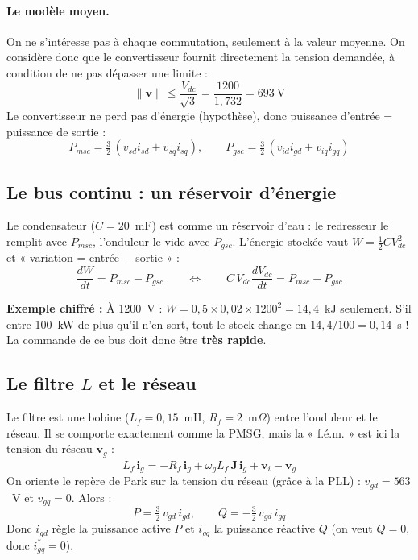 \documentclass[11pt,a4paper]{article}
\newcommand{\bv}[1]{\boldsymbol{#1}}
\newcommand{\Exemple}{\textbf{Exemple chiffré : }}
\begin{document}
\paragraph{Le modèle moyen.}
On ne s'intéresse pas à chaque commutation, seulement à la valeur moyenne. On considère donc que le
convertisseur fournit directement la tension demandée, à condition de ne pas dépasser une limite :
\begin{equation}
\|\bv{v}\| \le \frac{V_{dc}}{\sqrt3} = \frac{1200}{1{,}732} = 693~\text{V}
\end{equation}
Le convertisseur ne perd pas d'énergie (hypothèse), donc puissance d'entrée = puissance de sortie :
\begin{equation}
P_{msc} = \tfrac32\,(v_{sd}i_{sd}+v_{sq}i_{sq}),\qquad P_{gsc} = \tfrac32\,(v_{id}i_{gd}+v_{iq}i_{gq})
\end{equation}

\subsection{Le bus continu : un réservoir d'énergie}
Le condensateur ($C=20$~mF) est comme un réservoir d'eau : le redresseur le remplit avec $P_{msc}$, l'onduleur
le vide avec $P_{gsc}$. L'énergie stockée vaut $W = \tfrac12 C V_{dc}^2$ et « variation = entrée $-$ sortie » :
\begin{equation}
\frac{dW}{dt} = P_{msc} - P_{gsc}\qquad\Longleftrightarrow\qquad C\,V_{dc}\frac{dV_{dc}}{dt}=P_{msc}-P_{gsc}
\end{equation}
\begin{exemple}
\Exemple
À 1200~V : $W = 0{,}5\times 0{,}02\times 1200^2 = 14{,}4$~kJ seulement.
S'il entre 100~kW de plus qu'il n'en sort, tout le stock change en $14{,}4/100 = 0{,}14$~s !
La commande de ce bus doit donc être \textbf{très rapide}.
\end{exemple}

\subsection{Le filtre $L$ et le réseau}
Le filtre est une bobine ($L_f=0{,}15$~mH, $R_f=2$~m$\Omega$) entre l'onduleur et le réseau. Il se comporte
exactement comme la PMSG, mais la « f.é.m. » est ici la tension du réseau $\bv{v}_g$ :
\begin{equation}
L_f\,\dot{\bv{i}}_g = -R_f\,\bv{i}_g + \omega_g L_f\,\mathbf{J}\,\bv{i}_g + \bv{v}_i - \bv{v}_g
\end{equation}
On oriente le repère de Park sur la tension du réseau (grâce à la PLL) : $v_{gd}=563$~V et $v_{gq}=0$. Alors :
\begin{equation}
P = \tfrac32\,v_{gd}\,i_{gd},\qquad Q = -\tfrac32\,v_{gd}\,i_{gq}
\end{equation}
Donc $i_{gd}$ règle la puissance active $P$ et $i_{gq}$ la puissance réactive $Q$ (on veut $Q=0$, donc $i_{gq}^*=0$).
\end{document}
